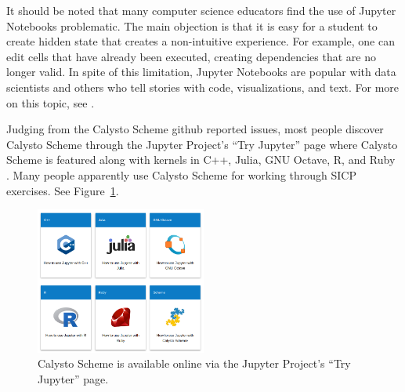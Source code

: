 \documentclass[acmsmall,screen,authorversion]{acmart}
\begin{document}
It should be noted that many computer science educators find the use
of Jupyter Notebooks problematic. The main objection is that it is
easy for a student to create hidden state that creates a non-intuitive
experience. For example, one can edit cells that have already been
executed, creating dependencies that are no longer valid. In spite of
this limitation, Jupyter Notebooks are popular with data scientists
and others who tell stories with code, visualizations, and text. For
more on this topic, see \cite{Calico2}.

Judging from the Calysto Scheme github reported issues, most people discover
Calysto Scheme through the Jupyter Project's ``Try Jupyter'' page where Calysto
Scheme is featured along with kernels in C++, Julia, GNU Octave, R, and Ruby
\cite{TryJupyter}. Many people apparently use Calysto Scheme for working
through SICP exercises. See Figure~\ref{fig:try-jupyter}.

\begin{figure}[h]
  \centering
  \includegraphics[width=0.5\textwidth]{try-jupyter.png}
  \caption{Calysto Scheme is available online via the Jupyter Project's ``Try Jupyter'' page.}
  \label{fig:try-jupyter}
\end{figure}



\end{document}
